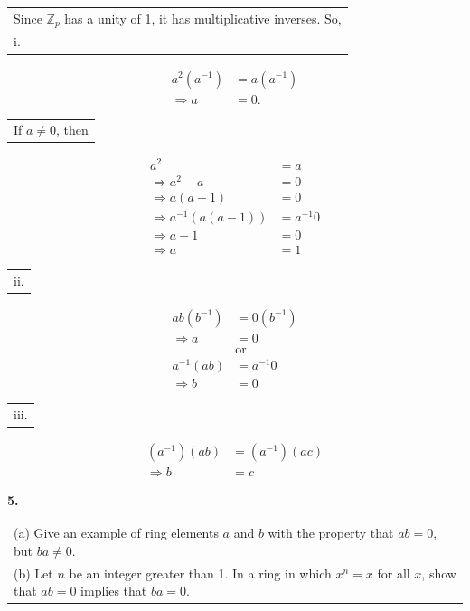 \documentclass[12pt, letterpaper]{article}
\begin{document}
\begin{tabular}[t]{l}
    Since $\mathbb{Z}_p$ has a unity of 1, it has multiplicative inverses. So, \\
    \indent i.
    \end{tabular}
    \begin{align*}
        a^{2}(a^{-1}) &= a(a^{-1}) \\
        \Rightarrow a &= 0.
        \end{align*}
        \indent \indent \begin{tabular}[t]{l}
            If $a \neq 0$, then
            \end{tabular}
            \begin{align*}
                a^{2} &= a \\
                \Rightarrow a^2 - a &= 0 \\
                \Rightarrow a(a - 1) &= 0 \\
               \Rightarrow a^{-1}(a(a - 1)) &= a^{-1}0 \\
               \Rightarrow a - 1 & = 0 \\
               \Rightarrow a &= 1
                \end{align*}
    \indent \indent \begin{tabular}[t]{l}
        ii.
        \end{tabular}
        \begin{align*}
            ab(b^{-1}) &= 0(b^{-1}) \\
            \Rightarrow a &= 0 \ \\
            &\text{or}  \\ 
            a^{-1}(ab) &= a^{-1}0 \\
            \Rightarrow b &= 0
            \end{align*}
   \indent \indent \begin{tabular}[t]{l}
    iii.
        \end{tabular}
        \begin{align*}
            (a^{-1})(ab) &= (a^{-1})(ac) \\
            \Rightarrow b &= c
            \end{align*}

\bigskip

\textbf{5.} \begin{tabular}[t]{@{}p{}@{}}
    (a) Give an example of ring elements $a$ and $b$ with the property that $ab = 0$, but $ba \neq 0$. \\[6pt]
    (b) Let $n$ be an integer greater than 1. In a ring in which $x^n = x$ for all $x$, show that $ab = 0$ implies that $ba = 0$.
\end{tabular} \\
\end{document}
